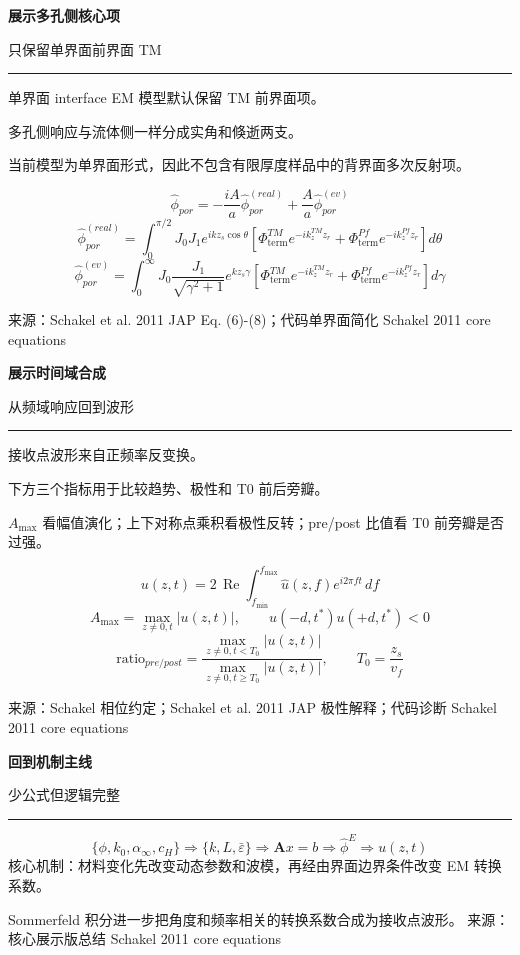 \documentclass[12pt]{article}
\newcounter{slide}
\newcommand{\TitleFont}{\fontsize{32}{38}\selectfont\bfseries}
\newcommand{\TagFont}{\fontsize{16}{20}\selectfont}
\newcommand{\BodyFont}{\fontsize{18}{24}\selectfont}
\newcommand{\SmallFont}{\fontsize{16}{21}\selectfont}
\newcommand{\FootFont}{\fontsize{12}{14}\selectfont}
\newcommand{\FormulaFont}{\fontsize{18}{23}\selectfont}
\newcommand{\BigFormulaFont}{\fontsize{23}{29}\selectfont}
\newcommand{\src}[1]{\vfill{\SmallFont\color{Grey}来源：#1}}
\newcommand{\one}[1]{{\BodyFont\color{Ink}#1}}
\newcommand{\explain}[1]{{\SmallFont\color{Grey}#1}}
\newenvironment{slide}[2]{%
  \clearpage
  \stepcounter{slide}
  \thispagestyle{empty}
  {\TitleFont\color{Ink}#1}\par
  \vspace{0.05in}
  {\TagFont\color{Blue}#2}\par
  \vspace{0.11in}
  {\color{Blue}\rule{\textwidth}{1.6pt}}\par
  \vspace{0.22in}
}{%
  \vfill
  {\FootFont\color{Grey}Schakel 2011 core equations}
  \hfill
  {\FootFont\color{Grey}\theslide}
}
\newcommand{\twocol}[2]{%
  \begin{minipage}[t]{0.32\textwidth}
  #1
  \end{minipage}\hfill
  \begin{minipage}[t]{0.63\textwidth}
  #2
  \end{minipage}
}
\begin{document}
\begin{slide}{展示多孔侧核心项}{只保留单界面前界面 TM}
\twocol{
\one{单界面 interface EM 模型默认保留 TM 前界面项。}\par
\vspace{0.20in}
\one{多孔侧响应与流体侧一样分成实角和倏逝两支。}\par
\vspace{0.20in}
\explain{当前模型为单界面形式，因此不包含有限厚度样品中的背界面多次反射项。}
}{
{\FormulaFont
\[
\hat{\phi}_{por}
=
-\frac{iA}{a}\hat{\phi}_{por}^{(real)}
+\frac{A}{a}\hat{\phi}_{por}^{(ev)}
\]
\[
\hat{\phi}_{por}^{(real)}
=
\int_0^{\pi/2}
J_0J_1 e^{ikz_s\cos\theta}
\left[
\Phi^{TM}_{\mathrm{term}}e^{-ik_z^{TM}z_r}
+
\Phi^{Pf}_{\mathrm{term}}e^{-ik_z^{Pf}z_r}
\right]d\theta
\]
\[
\hat{\phi}_{por}^{(ev)}
=
\int_0^\infty
J_0\frac{J_1}{\sqrt{\gamma^2+1}}e^{kz_s\gamma}
\left[
\Phi^{TM}_{\mathrm{term}}e^{-ik_z^{TM}z_r}
+
\Phi^{Pf}_{\mathrm{term}}e^{-ik_z^{Pf}z_r}
\right]d\gamma
\]
}
}
\src{Schakel et al. 2011 JAP Eq. (6)-(8)；代码单界面简化}
\end{slide}

\begin{slide}{展示时间域合成}{从频域响应回到波形}
\twocol{
\one{接收点波形来自正频率反变换。}\par
\vspace{0.20in}
\one{下方三个指标用于比较趋势、极性和 T0 前后旁瓣。}\par
\vspace{0.20in}
\explain{$A_{\max}$ 看幅值演化；上下对称点乘积看极性反转；pre/post 比值看 T0 前旁瓣是否过强。}
}{
{\FormulaFont
\[
u(z,t)=
2\,\operatorname{Re}
\int_{f_{\min}}^{f_{\max}}
\hat{u}(z,f)e^{i2\pi ft}\,df
\]
\[
A_{\max}=\max_{z\ne0,t}|u(z,t)|,
\qquad
u(-d,t^\ast)u(+d,t^\ast)<0
\]
\[
\mathrm{ratio}_{pre/post}
=
\frac{\max_{z\ne0,t<T_0}|u(z,t)|}
{\max_{z\ne0,t\ge T_0}|u(z,t)|},
\qquad
T_0=\frac{z_s}{v_f}
\]
}
}
\src{Schakel 相位约定；Schakel et al. 2011 JAP 极性解释；代码诊断}
\end{slide}

\begin{slide}{回到机制主线}{少公式但逻辑完整}
\vspace{0.35in}
{\BigFormulaFont
\[
\{\phi,k_0,\alpha_\infty,c_H\}
\Rightarrow
\{k,L,\bar{\varepsilon}\}
\Rightarrow
\mathbf{A}x=b
\Rightarrow
\hat{\phi}^{E}
\Rightarrow
u(z,t)
\]
}
\vspace{0.35in}
\one{核心机制：材料变化先改变动态参数和波模，再经由界面边界条件改变 EM 转换系数。}\par
\vspace{0.18in}
\explain{Sommerfeld 积分进一步把角度和频率相关的转换系数合成为接收点波形。}
\src{核心展示版总结}
\end{slide}
\end{document}
